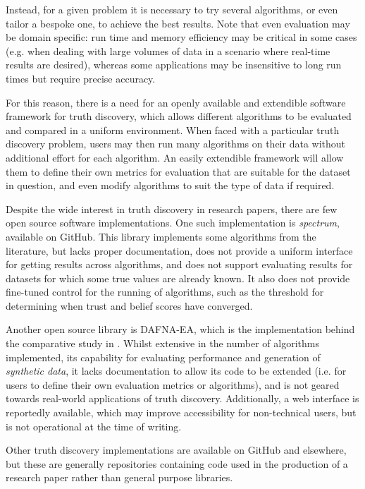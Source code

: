\documentclass[../main.tex]{subfiles}
\begin{document}
Instead, for a given problem it is necessary to try several algorithms, or even
tailor a bespoke one, to achieve the best results. Note that even evaluation
may be domain specific: run time and memory efficiency may be critical in some
cases (e.g. when dealing with large volumes of data in a scenario where
real-time results are desired), whereas some applications may be insensitive to
long run times but require precise accuracy.

For this reason, there is a need for an openly available and extendible
software framework for truth discovery, which allows different algorithms to be
evaluated and compared in a uniform environment. When faced with a particular
truth discovery problem, users may then run many algorithms on their data
without additional effort for each algorithm. An easily extendible framework
will allow them to define their own metrics for evaluation that are suitable
for the dataset in question, and even modify algorithms to suit the type of
data if required.

Despite the wide interest in truth discovery in research papers, there are few
open source software implementations. One such implementation is
\emph{spectrum}\footnotemark, available on GitHub. This library implements some
algorithms from the literature, but lacks proper documentation, does not
provide a uniform interface for getting results across algorithms, and does not
support evaluating results for datasets for which some true values are already
known. It also does not provide fine-tuned control for the running of
algorithms, such as the threshold for determining when trust and belief scores
have converged.


Another open source library is DAFNA-EA\footnotemark, which is the
implementation behind the comparative study in \cite{waguih}. Whilst extensive
in the number of algorithms implemented, its capability for evaluating
performance and generation of \emph{synthetic data}, it lacks documentation to
allow its code to be extended (i.e. for users to define their own evaluation
metrics or algorithms), and is not geared towards real-world applications of
truth discovery. Additionally, a web interface is reportedly available, which
may improve accessibility for non-technical users, but is not operational at
the time of writing.


Other truth discovery implementations are available on GitHub and
elsewhere\footnotemark, but these are generally repositories containing code
used in the production of a research paper rather than general purpose
libraries.
\end{document}
